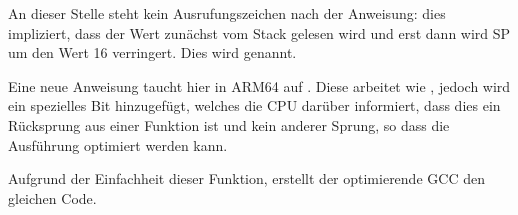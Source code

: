 An dieser Stelle steht kein Ausrufungszeichen nach der Anweisung: dies impliziert, dass der Wert zunächst
vom Stack gelesen wird und erst dann wird \ac{SP} um den Wert 16 verringert.
Dies wird  genannt.

Eine neue Anweisung taucht hier in ARM64 auf \RET.
Diese arbeitet wie , jedoch wird ein spezielles Bit hinzugefügt, welches die \ac{CPU}
darüber informiert, dass dies ein Rücksprung aus einer Funktion ist und kein anderer Sprung, so dass die
Ausführung optimiert werden kann.

Aufgrund der Einfachheit dieser Funktion, erstellt der optimierende GCC den gleichen Code.
